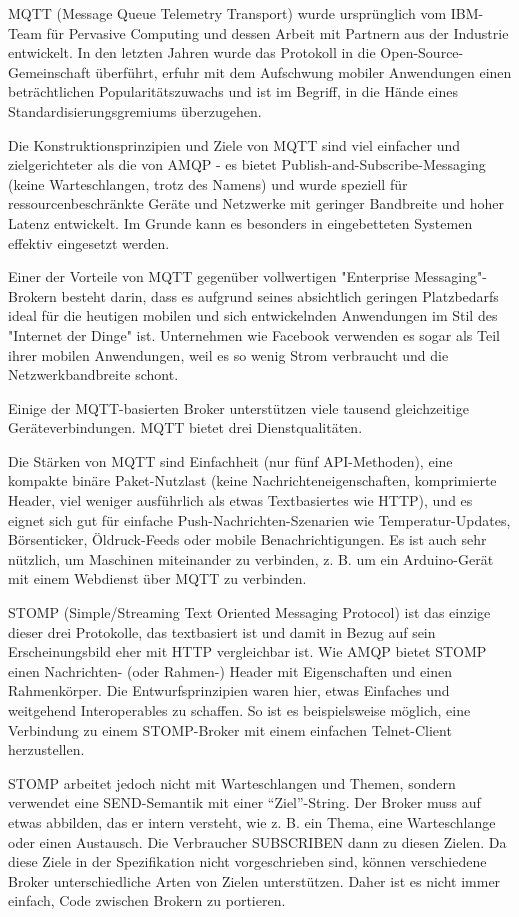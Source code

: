 MQTT (Message Queue Telemetry Transport) wurde ursprünglich vom IBM-Team für Pervasive Computing und dessen Arbeit mit Partnern aus der Industrie entwickelt. In den letzten Jahren wurde das Protokoll in die Open-Source-Gemeinschaft überführt, erfuhr mit dem Aufschwung mobiler Anwendungen einen beträchtlichen Popularitätszuwachs und ist im Begriff, in die Hände eines Standardisierungsgremiums überzugehen.

Die Konstruktionsprinzipien und Ziele von MQTT sind viel einfacher und zielgerichteter als die von AMQP - es bietet Publish-and-Subscribe-Messaging (keine Warteschlangen, trotz des Namens) und wurde speziell für ressourcenbeschränkte Geräte und Netzwerke mit geringer Bandbreite und hoher Latenz entwickelt. Im Grunde kann es besonders in eingebetteten Systemen effektiv eingesetzt werden.

Einer der Vorteile von MQTT gegenüber vollwertigen "Enterprise Messaging"-Brokern besteht darin, dass es aufgrund seines absichtlich geringen Platzbedarfs ideal für die heutigen mobilen und sich entwickelnden Anwendungen im Stil des "Internet der Dinge" ist. Unternehmen wie Facebook verwenden es sogar als Teil ihrer mobilen Anwendungen, weil es so wenig Strom verbraucht und die Netzwerkbandbreite schont.

Einige der MQTT-basierten Broker unterstützen viele tausend gleichzeitige Geräteverbindungen. MQTT bietet drei Dienstqualitäten.

Die Stärken von MQTT sind Einfachheit (nur fünf API-Methoden), eine kompakte binäre Paket-Nutzlast (keine Nachrichteneigenschaften, komprimierte Header, viel weniger ausführlich als etwas Textbasiertes wie HTTP), und es eignet sich gut für einfache Push-Nachrichten-Szenarien wie Temperatur-Updates, Börsenticker, Öldruck-Feeds oder mobile Benachrichtigungen. Es ist auch sehr nützlich, um Maschinen miteinander zu verbinden, z. B. um ein Arduino-Gerät mit einem Webdienst über MQTT zu verbinden.

STOMP (Simple/Streaming Text Oriented Messaging Protocol) ist das einzige dieser drei Protokolle, das textbasiert ist und damit in Bezug auf sein Erscheinungsbild eher mit HTTP vergleichbar ist. Wie AMQP bietet STOMP einen Nachrichten- (oder Rahmen-) Header mit Eigenschaften und einen Rahmenkörper. Die Entwurfsprinzipien waren hier, etwas Einfaches und weitgehend Interoperables zu schaffen. So ist es beispielsweise möglich, eine Verbindung zu einem STOMP-Broker mit einem einfachen Telnet-Client herzustellen.

STOMP arbeitet jedoch nicht mit Warteschlangen und Themen, sondern verwendet eine SEND-Semantik mit einer \enquote{Ziel}-String. Der Broker muss auf etwas abbilden, das er intern versteht, wie z. B. ein Thema, eine Warteschlange oder einen Austausch. Die Verbraucher SUBSCRIBEN dann zu diesen Zielen. Da diese Ziele in der Spezifikation nicht vorgeschrieben sind, können verschiedene Broker unterschiedliche Arten von Zielen unterstützen. Daher ist es nicht immer einfach, Code zwischen Brokern zu portieren.


